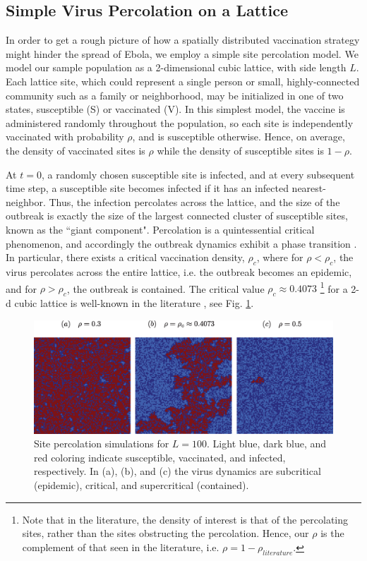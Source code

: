 \documentclass{article}
\begin{document}
\subsection{Simple Virus Percolation on a Lattice}
In order to get a rough picture of how a spatially distributed vaccination strategy might hinder the spread of Ebola, we employ a simple site percolation model. We model our sample population as a 2-dimensional cubic lattice, with side length $L$. Each lattice site, which could represent a single person or small, highly-connected community such as a family or neighborhood, may be initialized in one of two states, susceptible (S) or vaccinated (V). In this simplest model, the vaccine is administered randomly throughout the population, so each site is independently vaccinated with probability $\rho$, and is susceptible otherwise. Hence, on average, the density of vaccinated sites is $\rho$ while the density of susceptible sites is $1 - \rho$. 

At $t=0$, a randomly chosen susceptible site is infected, and at every subsequent time step, a susceptible site becomes infected if it has an infected nearest-neighbor. Thus, the infection percolates across the lattice, and the size of the outbreak is exactly the size of the largest connected cluster of susceptible sites, known as the ``giant component". Percolation is a quintessential critical phenomenon, and accordingly the outbreak dynamics exhibit a phase transition \cite{Sole2011}. In particular, there exists a critical vaccination density, $\rho_{c}$, where for $\rho <  \rho_{c}$, the virus percolates across the entire lattice, i.e. the outbreak becomes an epidemic, and for $\rho >  \rho_{c}$, the outbreak is contained. The critical value $\rho_{c}\approx0.4073$ \footnote{Note that in the literature, the density of interest is that of the percolating sites, rather than the sites obstructing the percolation. Hence, our $\rho$ is the complement of that seen in the literature, i.e. $\rho=1-\rho_{literature}$.} for a 2-d cubic lattice is well-known in the literature \cite{Christensen2005}, see Fig. \ref{fig:percolation}. 

\begin{figure}[H]
\centering
\includegraphics[scale=0.4]{figs/perc.eps}
\caption{Site percolation simulations for $L=100$. Light blue, dark blue, and red coloring indicate susceptible, vaccinated, and infected, respectively. In (a), (b), and (c) the virus dynamics are subcritical (epidemic), critical, and supercritical (contained).}
\label{fig:percolation}
\end{figure}
\end{document}
